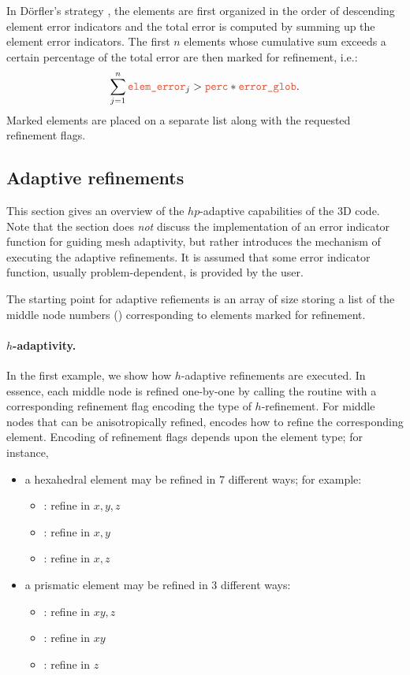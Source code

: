 In D\"orfler's strategy \cite{dorfler1996marking}, the elements are first organized in the order of descending element error indicators and the total error  is computed by summing up the element error indicators. The first $n$ elements whose cumulative sum exceeds a certain percentage of the total error are then marked for refinement, i.e.:
\[
	\sum_{j=1}^n \var{elem\_error}_j > \var{perc} * \var{error\_glob} .
\]
Marked elements are placed on a separate list along with the requested refinement flags.

\subsection{Adaptive refinements}
\label{sec:adaptive-refinements}

This section gives an overview of the $hp$-adaptive capabilities of the \hp3D code. Note that the section does \emph{not} discuss the implementation of an error indicator function for guiding mesh adaptivity, but rather introduces the mechanism of executing the adaptive refinements. It is assumed that some error indicator function, usually problem-dependent, is provided by the user. 

The starting point for adaptive refiements is an array  of size  storing a list of the middle node numbers () corresponding to elements marked for refinement.

\paragraph{$h$-adaptivity.}
In the first example, we show how $h$-adaptive refinements are executed. In essence, each middle node is refined one-by-one by calling the  routine with a corresponding refinement flag  encoding the type of $h$-refinement. For middle nodes that can be anisotropically refined,  encodes how to refine the corresponding element. Encoding of refinement flags depends upon the element type; for instance,
\begin{itemize}
	\item a hexahedral element may be refined in 7 different ways; for example:
	\begin{itemize}
		\itemsep 0pt
		\item {} : refine in $x,y,z$
		\item {} : refine in $x,y$
		\item {} : refine in $x,z$
	\end{itemize}
	\item a prismatic element may be refined in 3 different ways:
	\begin{itemize}
		\itemsep 0pt
		\item {} : refine in $xy,z$
		\item {} : refine in $xy$
		\item {} : refine in $z$
	\end{itemize}
\end{itemize}

